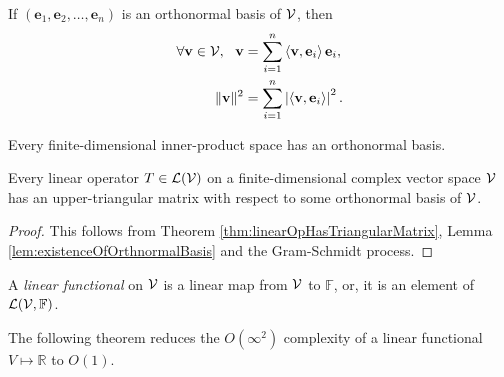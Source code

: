\begin{thm}
  \label{thm:significanceOfOthonormalBases}
  If $(\mathbf{e}_1, \mathbf{e}_2, \ldots, \mathbf{e}_n)$
  is an orthonormal basis of ${\cal V}$,
  then 
  \begin{subequations}
    \label{eq:expressVectorsInOrthonormalBasis}
    \begin{align}
      \forall \mathbf{v}\in {\cal V},\ \ 
      \mathbf{v}
      &= \sum_{i=1}^n \innerProd{\mathbf{v}, \mathbf{e}_i} \mathbf{e}_i,
      \\
      \|\mathbf{v}\|^2
      &= \sum_{i=1}^n \left|\innerProd{\mathbf{v}, \mathbf{e}_i}\right|^2.
    \end{align}
  \end{subequations}
\end{thm}

\begin{lem}
  \label{lem:existenceOfOrthnormalBasis}
  Every finite-dimensional inner-product space has an orthonormal basis.
\end{lem}

\begin{thm}[Schur]
  \label{thm:Schur}
  Every linear operator $T\in {\cal L}({\cal V})$
  on a finite-dimensional complex vector space ${\cal V}$ 
  has an upper-triangular matrix
  with respect to some orthonormal basis of ${\cal V}$.
\end{thm}
\begin{proof}
  This follows from Theorem \ref{thm:linearOpHasTriangularMatrix}, 
  Lemma \ref{lem:existenceOfOrthnormalBasis}
  and the Gram-Schmidt process.
\end{proof}

\begin{defn}
  \label{def:linearFunctional}
  A \emph{linear functional} on ${\cal V}$ is a linear map from ${\cal V}$ to
  $\mathbb{F}$,
  or, it is an element of ${\cal L}({\cal V},\mathbb{F})$.
\end{defn}

\begin{rem}
  The following theorem reduces
  the $O(\infty^2)$ complexity of a linear functional
  $V\mapsto \mathbb{R}$
  to $O(1)$.
\end{rem}

